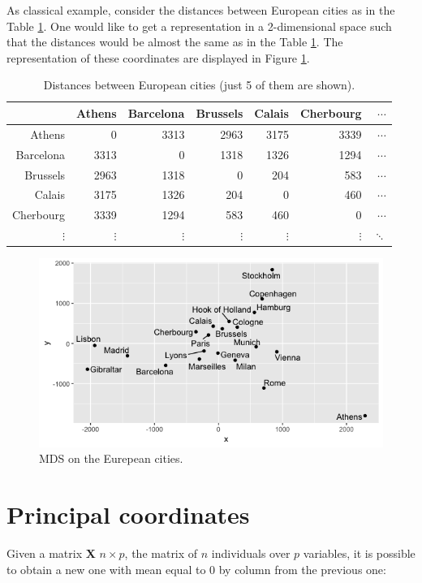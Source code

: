\documentclass[11pt]{report}
\begin{document}
\indent As classical example, consider the distances between European cities as
in the Table \ref{european_distances}. One would like to get a representation in
a 2-dimensional space such that the distances would be almost the same as in the 
Table \ref{european_distances}. The representation of these coordinates are 
displayed in Figure \ref{europ_cities}.

\begin{table}[ht]
\centering
\begin{tabular}{rrrrrrr}
  \hline
 & Athens & Barcelona & Brussels & Calais & Cherbourg & $\dotsi$ \\ 
  \hline
Athens & 0 & 3313 & 2963 & 3175 & 3339 & $\dotsi$ \\ 
  Barcelona & 3313 & 0& 1318 & 1326 & 1294 & $\dotsi$ \\ 
  Brussels & 2963 & 1318 & 0 & 204 & 583 & $\dotsi$ \\ 
  Calais & 3175 & 1326 & 204 & 0 & 460 & $\dotsi$ \\ 
  Cherbourg & 3339 & 1294 & 583 & 460 & 0 & $\dotsi$ \\
  $\vdots$ & $\vdots$ & $\vdots$ & $\vdots$ & $\vdots$ & $\vdots$ & $\ddots$ \\
   \hline
\end{tabular}
\caption{Distances between European cities (just 5 of them are shown).} 
\label{european_distances}
\end{table}


\begin{figure}[ht]
\centering
    \includegraphics[scale = 0.5]{./images/europ_cities.png}
    \caption{MDS on the Eurepean cities.}
    \label{europ_cities}
\end{figure}


\section{Principal coordinates}
Given a matrix \textbf{X} $n \times p$, the matrix of $n$ 
individuals over $p$ variables, it is possible to obtain a new one with 
mean equal to 0 by column from the previous one:
\end{document}

